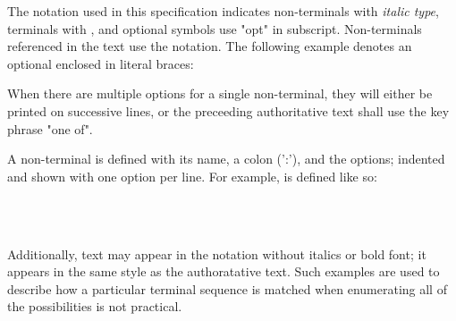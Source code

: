 


\specsubitem
The notation used in this specification indicates non-terminals with
\textit{italic type}, terminals with , and optional
symbols use "opt" in subscript. Non-terminals referenced in the text use the
 notation. The following example denotes an optional
 enclosed in literal braces:

\begin{grammar}
\terminal{\{}  \terminal{\}}
\end{grammar}

\specsubitem
When there are multiple options for a single non-terminal, they will either be
printed on successive lines, or the preceeding authoritative text shall use the
key phrase "one of".

\specsubitem
A non-terminal is defined with its name, a colon (':'), and the options;
indented and shown with one option per line. For example,
 is defined like so:

\begin{grammar}
\\
	 \optional{\terminal{,}}\\
	 \terminal{,} 
\end{grammar}

\specsubitem
Additionally, text may appear in the notation without italics or bold font; it
appears in the same style as the authoratative text. Such examples are used to
describe how a particular terminal sequence is matched when enumerating all of
the possibilities is not practical.

\begin{grammar}
 \\
\end{grammar}






